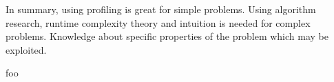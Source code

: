 In summary, using profiling is great for simple problems. Using algorithm research, runtime complexity theory and intuition is needed for complex problems. Knowledge about specific properties of the problem which may be exploited.

foo




